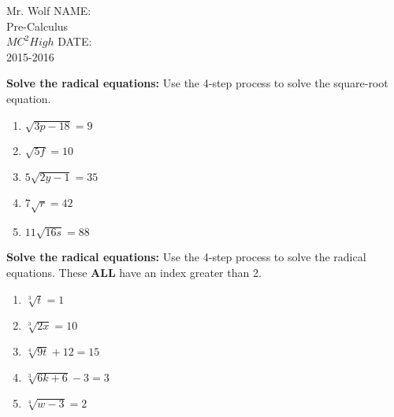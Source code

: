 \documentclass[12pt]{article}
\begin{document}
Mr. Wolf \hfill NAME:\underline{\hspace{3in}}\\ 
Pre-Calculus \\ 
$MC^2 High$ \hfill DATE:\underline{\hspace{2in}}\\
2015-2016



\textbf{Solve the radical equations:} Use the 4-step process to solve the square-root equation.\\

\begin{enumerate}
	
		\item $\sqrt{3p-18}=9$\\
		
		\item $\sqrt{5f}=10$\\
		
		\item $5\sqrt{2y-1}=35$\\
		
		\item $7\sqrt{r}=42$\\
		
		\item $11\sqrt{16s}=88$\\
	
\end{enumerate}

\hrulefill

\textbf{Solve the radical equations:} Use the 4-step process to solve the radical equations. These \textbf{ALL} have an index greater than 2.\\

\begin{enumerate}[resume]

	\item $\sqrt[3]{t}=1$\\
	
	
	\item $\sqrt[3]{2x}=10$\\
	
	
	\item $\sqrt[4]{9t}+12=15$\\
	
	
	\item $\sqrt[3]{6k+6}-3=3$\\
	
	
	\item $\sqrt[4]{w-3}=2$\\

\end{enumerate}
\end{document}
